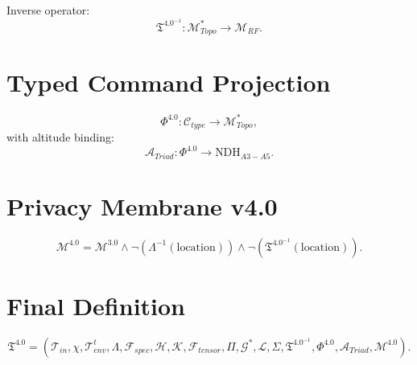 \documentclass[11pt]{article}
\begin{document}
Inverse operator:
\[
\mathfrak{T}^{4.0^{-1}} : \mathcal{M}_{Topo}^{\ast} \to \mathcal{M}_{RF}.
\]

\section{Typed Command Projection}
\[
\Phi^{4.0} : \mathcal{C}_{type} \to \mathcal{M}_{Topo}^{\ast},
\]
with altitude binding:
\[
\mathcal{A}_{Triad} : \Phi^{4.0} \to \text{NDH}_{A3-A5}.
\]

\section{Privacy Membrane v4.0}
\[
\mathcal{M}^{4.0}
= \mathcal{M}^{3.0} \land \neg(\Lambda^{-1}(\text{location})) \land \neg(\mathfrak{T}^{4.0^{-1}}(\text{location})).
\]

\section{Final Definition}
\[
\boxed{
\mathfrak{T}^{4.0} =
(\mathcal{T}_{in},\chi,\mathcal{T}_{env}^{t},\Lambda,
\mathcal{F}_{spec},\mathcal{H},\mathcal{K},
\mathcal{F}_{tensor},\Pi,
\mathcal{G}^{\ast},\mathcal{L},\Sigma,
\mathfrak{T}^{4.0^{-1}},\Phi^{4.0},\mathcal{A}_{Triad},\mathcal{M}^{4.0})
}.
\]
\end{document}
